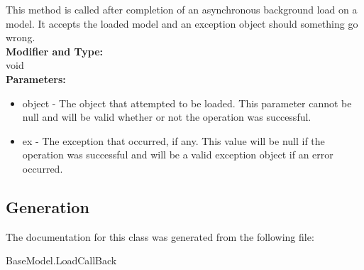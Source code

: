 This method is called after completion of an asynchronous background load on a model. It accepts the loaded model and an exception object should something go wrong.\\

\textbf{Modifier and Type:}\\
\tab void\\

\textbf{Parameters:}\\
\begin{itemize}
\item object - The object that attempted to be loaded. This parameter cannot be null and will be valid whether or not the operation was successful.
\item ex - The exception that occurred, if any. This value will be null if the operation was successful and will be a valid exception object if an error occurred.
\end{itemize}







\subsection{Generation}
The documentation for this class was generated from the following file\-:
\begin{DoxyCompactItemize}
\item BaseModel.LoadCallBack
\end{DoxyCompactItemize} 









